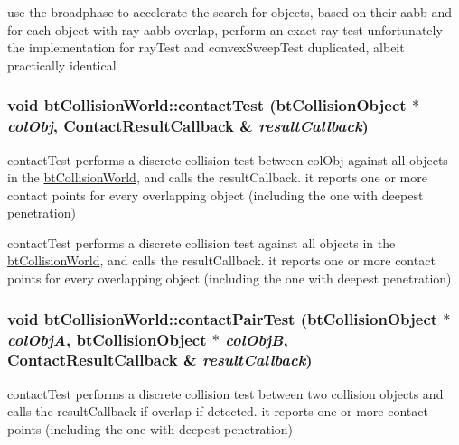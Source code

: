 use the broadphase to accelerate the search for objects, based on their aabb and for each object with ray-aabb overlap, perform an exact ray test unfortunately the implementation for rayTest and convexSweepTest duplicated, albeit practically identical \hypertarget{classbt_collision_world_e1d167b53de82d4f97a47118f8480999}{
\subsubsection[contactTest]{\setlength{\rightskip}{0pt plus 5cm}void btCollisionWorld::contactTest (btCollisionObject $\ast$ {\em colObj}, \/  {\bf ContactResultCallback} \& {\em resultCallback})}}
\label{classbt_collision_world_e1d167b53de82d4f97a47118f8480999}


contactTest performs a discrete collision test between colObj against all objects in the \hyperlink{classbt_collision_world}{btCollisionWorld}, and calls the resultCallback. it reports one or more contact points for every overlapping object (including the one with deepest penetration)

contactTest performs a discrete collision test against all objects in the \hyperlink{classbt_collision_world}{btCollisionWorld}, and calls the resultCallback. it reports one or more contact points for every overlapping object (including the one with deepest penetration) \hypertarget{classbt_collision_world_abbec542dcd348041db6d07b36a640c8}{
\subsubsection[contactPairTest]{\setlength{\rightskip}{0pt plus 5cm}void btCollisionWorld::contactPairTest (btCollisionObject $\ast$ {\em colObjA}, \/  btCollisionObject $\ast$ {\em colObjB}, \/  {\bf ContactResultCallback} \& {\em resultCallback})}}
\label{classbt_collision_world_abbec542dcd348041db6d07b36a640c8}


contactTest performs a discrete collision test between two collision objects and calls the resultCallback if overlap if detected. it reports one or more contact points (including the one with deepest penetration)


